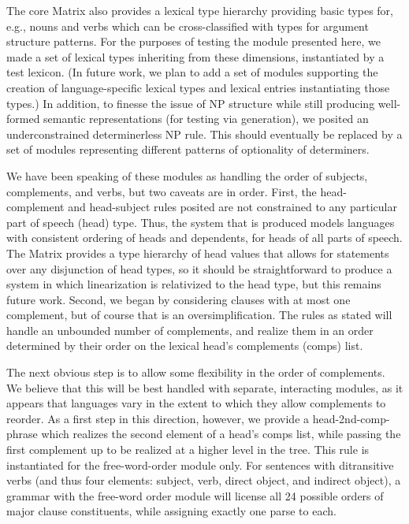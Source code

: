 \documentclass[11pt]{article}
\begin{document}
The core Matrix also provides a lexical type hierarchy providing basic
types for, e.g., nouns and verbs which can be
cross-classified with types for argument structure patterns.
For the purposes of testing the module presented here, we made a set
of lexical types inheriting from these dimensions, instantiated by a
test lexicon.  (In future work, we plan to add a set of modules
supporting the creation of language-specific lexical types and lexical
entries instantiating those types.)  In addition, to finesse the issue
of NP structure while still producing well-formed semantic
representations (for testing via generation), we posited an
underconstrained determinerless NP rule.  This should eventually be
replaced by a set of modules representing different patterns of
optionality of determiners.

We have been speaking of these modules as handling the order of
subjects, complements, and verbs, but two caveats are in order.  First,
the head-complement and head-subject rules posited are not constrained
to any particular part of speech ({\sc head}) type. Thus, the system that is
produced models languages with consistent ordering of heads and
dependents, for heads of all parts of speech.  The Matrix provides a
type hierarchy of {\sc head} values that allows for statements over any
disjunction of head types, so it should be straightforward to produce
a system in which linearization is relativized to the head type, but
this remains future work.  Second, we began by considering clauses
with at most one complement, but of course that is an
oversimplification.  The rules as stated will handle an unbounded
number of complements, and realize them in an order determined by
their order on the lexical head's complements ({\sc comps}) list.

The next obvious step is to allow some flexibility in the order of
complements.  We believe that this will be best handled with separate,
interacting modules, as it appears that languages vary in the
extent to which they allow complements to reorder.
As a first step in this direction,
however, we provide a head-2nd-comp-phrase which realizes the
second element of a head's {\sc comps} list, while passing the first
complement up to be realized at a higher level in the tree.  This rule
is instantiated for the free-word-order module only.  For sentences
with ditransitive verbs (and thus four elements: subject, verb, direct
object, and indirect object), a grammar with the free-word order
module will license all 24 possible orders of major clause
constituents, while assigning exactly one parse to each.
\end{document}

